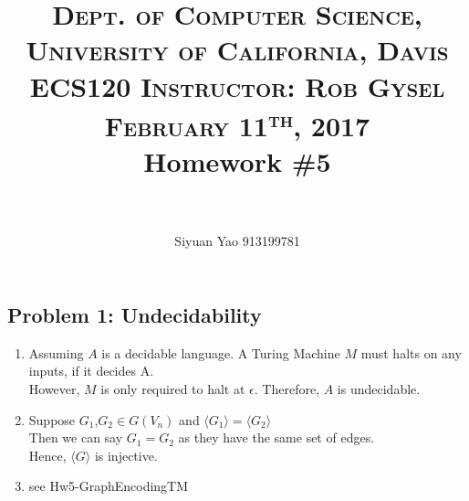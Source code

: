 \documentclass[paper=a4, fontsize=11pt]{scrartcl} %
\title{	
\normalfont \normalsize 
\textsc{Dept. of Computer Science, University of California, Davis\\ECS120 \hspace{.5in} Instructor: Rob Gysel \hspace{.5in} February 11\textsuperscript{th}, 2017} %
\horrule{0.5pt} \\[0.4cm] %
\huge Homework \#5 \\ %
\horrule{2pt} \\[0.5cm] %
}
\author{Siyuan Yao	913199781} %
\date{}
\numberwithin{equation}{section} %
\numberwithin{figure}{section} %
\numberwithin{table}{section} %
\theoremstyle{definition}
\begin{document}
\maketitle %

\subsection*{Problem 1: Undecidability}
\begin{enumerate}[label=(\alph*)]
	\item Assuming $A$ is a decidable language. A Turing Machine $M$ must halts on any inputs, if it decides A.  \\
		  However, $M$ is only required to halt at $\epsilon$. Therefore, $A$ is undecidable.
	\item Suppose $G_1$,$G_2\in G(V_n)$ and $\langle G_1 \rangle = \langle G_2 \rangle$ \\
	Then we can say $G_1=G_2$ as they have the same set of edges.\\
	Hence, $\langle G\rangle$ is injective.


	\item see Hw5-GraphEncodingTM

\end{enumerate}
\end{document}
